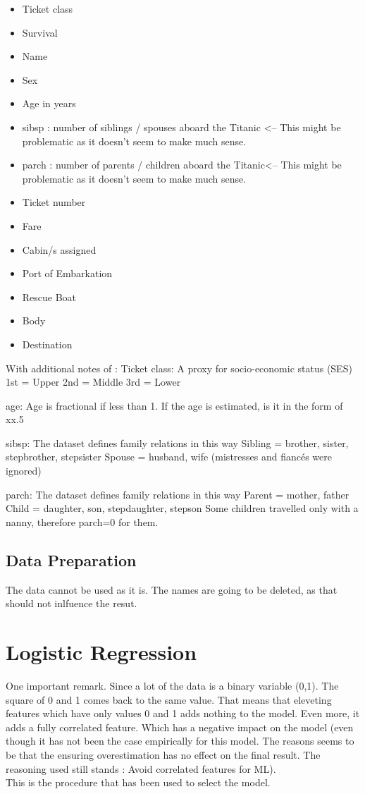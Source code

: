 \documentclass{article}
\begin{document}
\begin{itemize}
\item Ticket class
\item Survival 
\item Name
\item Sex
\item Age in years
\item sibsp : number of siblings / spouses aboard the Titanic <-- This might be problematic as it doesn't seem to make much sense.
\item parch : number of parents / children aboard the Titanic<-- This might be problematic as it doesn't seem to make much sense.
\item Ticket number	
\item Fare
\item Cabin/s assigned
\item Port of Embarkation	
\item Rescue Boat
\item Body
\item Destination
\end{itemize}

With additional notes of :
Ticket class: A proxy for socio-economic status (SES)
1st = Upper
2nd = Middle
3rd = Lower

age: Age is fractional if less than 1. If the age is estimated, is it in the form of xx.5

sibsp: The dataset defines family relations in this way
Sibling = brother, sister, stepbrother, stepsister
Spouse = husband, wife (mistresses and fiancés were ignored)

parch: The dataset defines family relations in this way
Parent = mother, father
Child = daughter, son, stepdaughter, stepson
Some children travelled only with a nanny, therefore parch=0 for them.



\subsection{Data Preparation}
The data cannot be used as it is.
The names are going to be deleted, as that should not inlfuence the resut.

\section{Logistic Regression}
One important remark. Since a lot of the data is a binary variable (0,1). The square of 0 and 1 comes back to the same value. That means that eleveting features which have only values 0 and 1 adds nothing to the model. Even more, it adds a fully correlated feature. Which has a negative impact on the model (even though it has not been the case empirically for this model. The reasons seems to be that the ensuring overestimation has no effect on the final result. The reasoning used still stands : Avoid correlated features for ML).
\\
This is the procedure that has been used to select the model.
\end{document}
